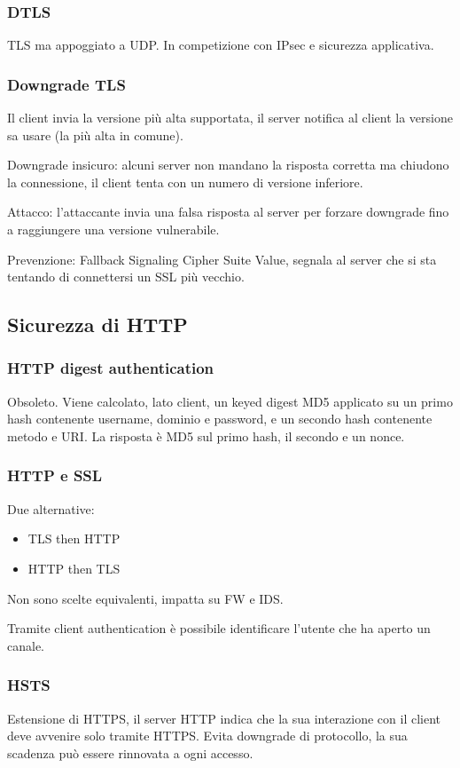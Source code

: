 \documentclass[11pt]{article}
\begin{document}
\subsubsection{DTLS}
TLS ma appoggiato a UDP. In competizione con IPsec e sicurezza applicativa.
\subsubsection{Downgrade TLS}
Il client invia la versione più alta supportata, il server notifica al client la versione sa usare (la più alta in comune).

Downgrade insicuro: alcuni server non mandano la risposta corretta ma chiudono la connessione, il client tenta con un numero 
di versione inferiore.

Attacco: l'attaccante invia una falsa risposta al server per forzare downgrade fino a raggiungere una versione vulnerabile.

Prevenzione: Fallback Signaling Cipher Suite Value, segnala al server che si sta tentando di connettersi un SSL più vecchio.
\subsection{Sicurezza di HTTP}
\subsubsection{HTTP digest authentication}
Obsoleto. Viene calcolato, lato client, un keyed digest MD5 applicato su un primo hash contenente username, dominio e password, 
e un secondo hash contenente metodo e URI. La risposta è MD5 sul primo hash, il secondo e un nonce.
\subsubsection{HTTP e SSL}
Due alternative:
\begin{itemize}
    \item TLS then HTTP 
    \item HTTP then TLS 
\end{itemize}
Non sono scelte equivalenti, impatta su FW e IDS.

Tramite client authentication è possibile identificare l'utente che ha aperto un canale. 
\subsubsection{HSTS}
Estensione di HTTPS, il server HTTP indica che la sua interazione con il client deve avvenire solo tramite HTTPS. Evita 
downgrade di protocollo, la sua scadenza può essere rinnovata a ogni accesso. 
\end{document}

